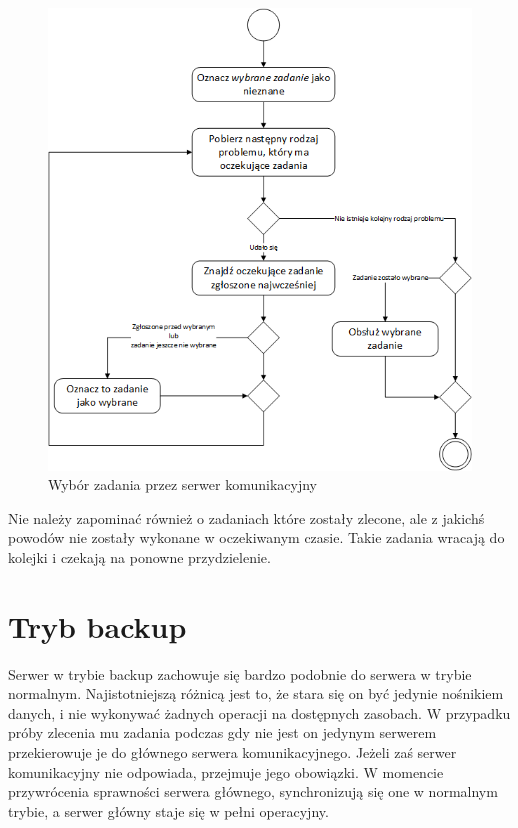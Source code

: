 \documentclass{report}
\begin{document}
	\begin{figure}[h]
		\centering
		\includegraphics[width=\textwidth]{img/CommunicationServer-SelectTask.png}
		\caption{Wybór zadania przez serwer komunikacyjny}
	\end{figure}
	
	Nie należy zapominać również o zadaniach które zostały zlecone, ale z jakichś powodów
	nie zostały wykonane w oczekiwanym czasie. Takie zadania wracają do kolejki i czekają na
	ponowne przydzielenie.
	
\section{Tryb backup}
	Serwer w trybie backup zachowuje się bardzo podobnie do serwera w trybie normalnym.
	Najistotniejszą różnicą jest to, że stara się on być jedynie nośnikiem danych,
	i nie wykonywać żadnych operacji na dostępnych zasobach. W przypadku próby zlecenia
	mu zadania podczas gdy nie jest on jedynym serwerem przekierowuje je do głównego serwera
	komunikacyjnego. Jeżeli zaś serwer komunikacyjny nie odpowiada, przejmuje jego obowiązki.
	W momencie przywrócenia sprawności serwera głównego, synchronizują się one w normalnym
	trybie, a serwer główny staje się w pełni operacyjny.
	
\end{document}
